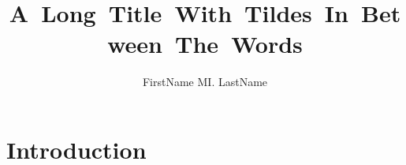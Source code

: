 \documentclass[12pt,dvipsnames]{report}	%
\author{FirstName MI. LastName}
\title{A~Long~Title~With~Tildes~In~Between~The~Words}
\begin{document}
    
    \titlepage              %
    
    \copyrightpage          %
    
    \approvalpage           %
    
    \begin{dedication}
    
    \end{dedication}
    
    \begin{epigraph}
    
    \end{epigraph}
    
    \begin{acknowledgments}		%
    
    \end{acknowledgments}
    
    \tableofcontents   
    \listoftables      
    \listoffigures     
    
    
    \chapter{Introduction}
    
    
    
\end{document}
